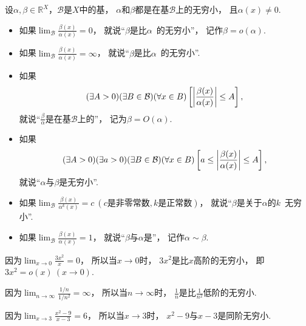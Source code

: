 \begin{definition}
设\(\alpha,\beta\in\mathbb{R}^X\)，\(\mathcal{B}\)是\(X\)中的基，
\(\alpha\)和\(\beta\)都是在基\(\mathcal{B}\)上的无穷小，
且\(\alpha(x)\neq0\).
\newcommand{\lf}[1][]{\lim_\mathcal{B} \frac{\beta(x)}{\alpha^{#1}(x)}}
\begin{itemize}
	\item 如果\(\lf=0\)，
	就说“\(\beta\)是比\(\alpha\)~的无穷小”，
	记作\(\beta=o(\alpha)\).

	\item 如果\(\lf=\infty\)，
	就说“\(\beta\)是比\(\alpha\)~的无穷小”.

	\item 如果\[
		(\exists A>0)
		(\exists B\in\mathcal{B})
		(\forall x\in B)
		\left[
			\abs{\frac{\beta(x)}{\alpha(x)}} \leq A
		\right],
	\]
	就说“\(\frac\beta\alpha\)是在基\(\mathcal{B}\)上的”，
	记为\(\beta = O(\alpha)\).

	\item 如果\[
		(\exists A>0)
		(\exists a>0)
		(\exists B\in\mathcal{B})
		(\forall x\in B)
		\left[
			a \leq \abs{\frac{\beta(x)}{\alpha(x)}} \leq A
		\right],
	\]
	就说“\(\alpha\)与\(\beta\)是无穷小”.

	\item 如果\(\lf[k]=c\ (\text{$c$是非零常数},\text{$k$是正常数})\)，
	就说“\(\beta\)是关于\(\alpha\)的\(k\)~无穷小”.

	\item 如果\(\lf=1\)，
	就说“\(\beta\)与\(\alpha\)是”，
	记作\(\alpha\sim\beta\).
\end{itemize}
\end{definition}

\begin{example}
因为\(\lim_{x\to0} \frac{3x^2}{x} = 0\)，
所以当\(x\to0\)时，
\(3x^2\)是比\(x\)高阶的无穷小，
即\(3x^2 = o(x)\ (x\to0)\).
\end{example}

\begin{example}
因为\(\lim_{n\to\infty} \frac{1/n}{1/n^2} = \infty\)，
所以当\(n\to\infty\)时，
\(\frac{1}{n}\)是比\(\frac{1}{n^2}\)低阶的无穷小.
\end{example}

\begin{example}
因为\(\lim_{x\to3} \frac{x^2-9}{x-3} = 6\)，
所以当\(x\to3\)时，
\(x^2-9\)与\(x-3\)是同阶无穷小.
\end{example}

